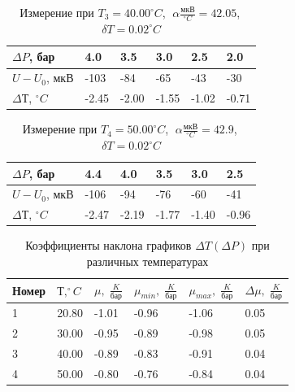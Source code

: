 \documentclass[a4paper,12pt]{article}
\begin{document}
\begin{enumerate}
		\begin{table}[h!] 
			\caption{Измерение при $T_3 = 40.00^\circ C$,$\;$ $\alpha\frac{мкВ}{^\circ C} = 42.05$,$\;$ $\delta T = 0.02^\circ C$}
			\begin{center}
				\begin{tabular}{|*{6}{l|}} \hline
					$\Delta P$, бар & 4.0 & 3.5 & 3.0 & 2.5 & 2.0 \\ \hline
					$U - U_0$, мкВ & -103 & -84 & -65 & -43 & -30 \\ \hline
					$\Delta Т$, $^\circ C$ & -2.45 & -2.00 & -1.55 & -1.02 & -0.71 \\ \hline
				\end{tabular}
			\end{center}
		\end{table}
	
		\begin{table}[h!] 
			\caption{Измерение при $T_4 = 50.00^\circ C$,$\;$ $\alpha\frac{мкВ}{^\circ C} = 42.9$,$\;$ $\delta T = 0.02^\circ C$}
			\begin{center}
				\begin{tabular}{|*{6}{l|}} \hline
					$\Delta P$, бар & 4.4 & 4.0 & 3.5 & 3.0 & 2.5 \\ \hline
					$U - U_0$, мкВ & -106 & -94 & -76 & -60 & -41 \\ \hline
					$\Delta Т$, $^\circ C$ & -2.47 & -2.19 & -1.77 & -1.40 & -0.96 \\ \hline
				\end{tabular}
			\end{center}
		\end{table}

		\begin{table}[h!] 
			\caption{Коэффициенты наклона графиков $\Delta T (\Delta P)$ при различных температурах}
			\begin{center}
				\begin{tabular}{|*{6}{l|}} \hline
					Номер & $Т, ^\circ C$ & $\mu,\; \frac{K}{бар}$ & $\mu_{min},\; \frac{K}{бар}$ & $\mu_{max},\; \frac{K}{бар}$ & $\Delta \mu,\; \frac{K}{бар}$ \\ \hline
					1 & 20.80 & -1.01 & -0.96 & -1.06 & 0.05 \\ \hline
					2 & 30.00 & -0.95& -0.89 & -0.98 & 0.05 \\ \hline
					3 & 40.00 & -0.89 & -0.83 & -0.91 & 0.04 \\ \hline
					4 & 50.00 & -0.80 & -0.76 & -0.84 & 0.04 \\ \hline
				\end{tabular}
			\end{center}
		\end{table}
		

\end{enumerate}
\end{document}
